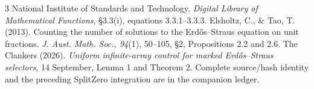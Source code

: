 \documentclass[10pt,a4paper]{article}
\begin{document}
\begin{thebibliography}{3}\small
{} National Institute of Standards and Technology. \emph{Digital Library
of Mathematical Functions}, \S3.3(i), equations 3.3.1--3.3.3.
 Elsholtz, C., \& Tao, T. (2013). Counting the number of solutions to
the Erd\H{o}s--Straus equation on unit fractions. \emph{J. Aust. Math. Soc., 94}(1),
50--105, \S2, Propositions 2.2 and 2.6.
 The Clankers (2026). \emph{Uniform infinite-array control for marked
Erd\H{o}s--Straus selectors}, 14 September, Lemma 1 and Theorem 2. Complete
source/hash identity and the preceding SplitZero integration are in the companion ledger.
\end{thebibliography}
\end{document}
